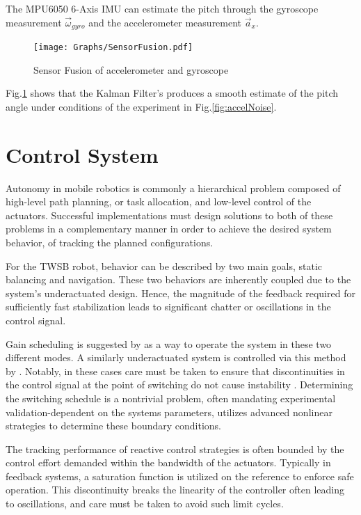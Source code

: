         The MPU6050 6-Axis IMU can estimate the pitch through the gyroscope measurement $\vec\omega_{gyro}$ and the accelerometer measurement $\vec a_{x}$.

        \begin{figure}[H]
            \centering
            \texttt{[image: Graphs/SensorFusion.pdf]}
            \caption{Sensor Fusion of accelerometer and gyroscope}
            \label{fig:SensorFusion}
        \end{figure}
       
        Fig.\ref{fig:SensorFusion} shows that the Kalman Filter's produces a smooth estimate of the pitch angle
        under conditions of the experiment in Fig.\ref{fig:accelNoise}. 
        \pagebreak{}

    \section{Control System}
        Autonomy in mobile robotics is commonly a hierarchical problem composed of high-level path planning, 
        or task allocation, and low-level control of the actuators.  
        Successful implementations must design solutions to both of these problems in a complementary manner in order 
        to achieve the desired system behavior, of tracking the planned configurations.
            
        For the TWSB robot, behavior can be described by two main goals, static balancing and navigation.
        These two behaviors are inherently coupled due to the system's underactuated design. Hence, the 
        magnitude of the feedback required for sufficiently fast stabilization leads to significant chatter or oscillations 
        in the control signal.

        Gain scheduling is suggested by \cite{refvem2019design}
        as a way to operate the system in these two different modes. A similarly underactuated system is controlled via this 
        method by \cite{wanggain}. Notably, in these cases care must be taken to ensure 
        that discontinuities in the control signal at the point of switching do not cause instability \cite{hespanha2002switching}.
        Determining the switching schedule is a nontrivial problem, often mandating experimental validation-dependent 
        on the systems parameters, \cite{RoboLimbo} utilizes advanced nonlinear strategies to determine these
        boundary conditions.

        The tracking performance of reactive control strategies is often bounded by the control effort 
        demanded within the bandwidth of the actuators. Typically in feedback systems, a saturation function 
        is utilized on the reference to enforce safe operation. This discontinuity breaks the linearity of the 
        controller often leading to oscillations, and care must be taken to avoid such limit cycles.
            
